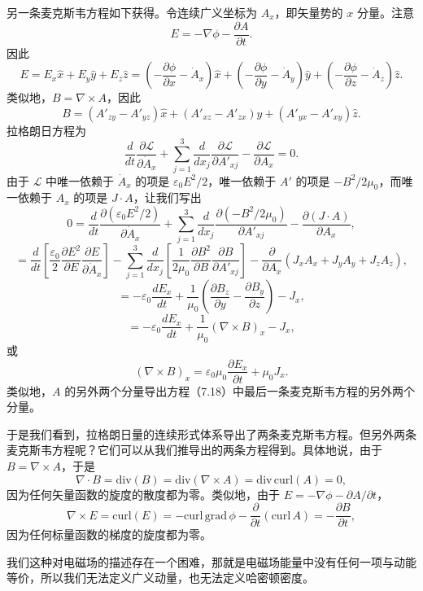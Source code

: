 另一条麦克斯韦方程如下获得。令连续广义坐标为 $A_x$，即矢量势的 $x$ 分量。注意
$$
E = -\nabla\phi - \frac{\partial A}{\partial t}.
$$
因此
$$
E = E_x\hat{x} + E_y\hat{y} + E_z\hat{z} = \left(-\frac{\partial\phi}{\partial x} - \dot{A}_x\right)\hat{x} + \left(-\frac{\partial\phi}{\partial y} - \dot{A}_y\right)\hat{y} + \left(-\frac{\partial\phi}{\partial z} - \dot{A}_z\right)\hat{z}.
$$
类似地，$B = \nabla\times A$，因此
$$
B = (A'_{zy} - A'_{yz})\hat{x} + (A'_{xz} - A'_{zx})\hat{y} + (A'_{yx} - A'_{xy})\hat{z}.
$$
拉格朗日方程为
$$
\frac{d}{dt}\frac{\partial\mathcal{L}}{\partial\dot{A}_x} + \sum_{j=1}^{3}\frac{d}{dx_j}\frac{\partial\mathcal{L}}{\partial A'_{xj}} - \frac{\partial\mathcal{L}}{\partial A_x} = 0.
$$
由于 $\mathcal{L}$ 中唯一依赖于 $\dot{A}_x$ 的项是 $\varepsilon_0E^2/2$，唯一依赖于 $A'$ 的项是 $-B^2/2\mu_0$，而唯一依赖于 $A_x$ 的项是 $J\cdot A$，让我们写出
$$
0 = \frac{d}{dt}\frac{\partial(\varepsilon_0E^2/2)}{\partial\dot{A}_x} + \sum_{j=1}^{3}\frac{d}{dx_j}\frac{\partial(-B^2/2\mu_0)}{\partial A'_{xj}} - \frac{\partial(J\cdot A)}{\partial A_x},
$$
$$
= \frac{d}{dt}\left[\frac{\varepsilon_0}{2}\frac{\partial E^2}{\partial E}\frac{\partial E}{\partial\dot{A}_x}\right] - \sum_{j=1}^{3}\frac{d}{dx_j}\left[\frac{1}{2\mu_0}\frac{\partial B^2}{\partial B}\frac{\partial B}{\partial A'_{xj}}\right] - \frac{\partial}{\partial A_x}\left(J_xA_x + J_yA_y + J_zA_z\right),
$$
$$
= -\varepsilon_0\frac{dE_x}{dt} + \frac{1}{\mu_0}\left(\frac{\partial B_z}{\partial y} - \frac{\partial B_y}{\partial z}\right) - J_x,
$$
$$
= -\varepsilon_0\frac{dE_x}{dt} + \frac{1}{\mu_0}(\nabla\times B)_x - J_x,
$$
或
$$
(\nabla\times B)_x = \varepsilon_0\mu_0\frac{\partial E_x}{\partial t} + \mu_0J_x.
$$
类似地，$A$ 的另外两个分量导出方程（7.18）中最后一条麦克斯韦方程的另外两个分量。

于是我们看到，拉格朗日量的连续形式体系导出了两条麦克斯韦方程。但另外两条麦克斯韦方程呢？它们可以从我们推导出的两条方程得到。具体地说，由于 $B = \nabla\times A$，于是
$$
\nabla\cdot B = \mathrm{div}(B) = \mathrm{div}(\nabla\times A) = \mathrm{div}\,\mathrm{curl}(A) = 0,
$$
因为任何矢量函数的旋度的散度都为零。类似地，由于 $E = -\nabla\phi - \partial A/\partial t$，
$$
\nabla\times E = \mathrm{curl}(E) = -\mathrm{curl}\,\mathrm{grad}\,\phi - \frac{\partial}{\partial t}(\mathrm{curl}\,A) = -\frac{\partial B}{\partial t},
$$
因为任何标量函数的梯度的旋度都为零。

我们这种对电磁场的描述存在一个困难，那就是电磁场能量中没有任何一项与动能等价，所以我们无法定义广义动量，也无法定义哈密顿密度。

